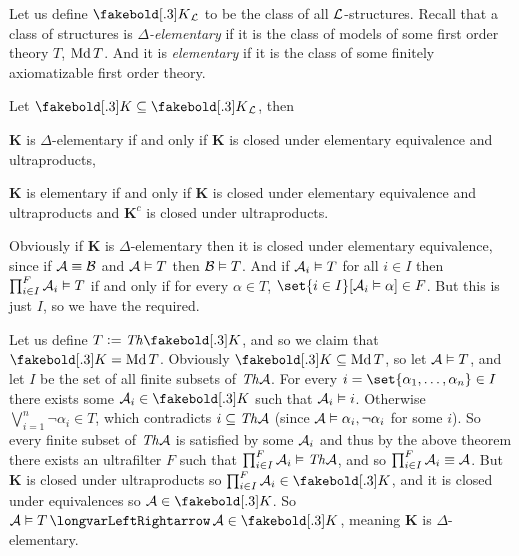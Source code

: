 Let us define $\boldsymbol K_{\cal L}$ to be the class of all ${\cal L}$-structures.
Recall that a class of structures is {\it $\Delta$-elementary} if it is the class of models of some first order theory $T$, $\mathop{\rm Md} T$.
And it is {\it elementary} if it is the class of some finitely axiomatizable first order theory.

\def\K{\boldsymbol K}
\bthrm

    Let $\K\subseteq\K_{\cal L}$, then
    \benum
        \item $\K$ is $\Delta$-elementary if and only if $\K$ is closed under elementary equivalence and ultraproducts,
        \item $\K$ is elementary if and only if $\K$ is closed under elementary equivalence and ultraproducts and $\K^c$ is closed under ultraproducts.
    \eenum

\ethrm

\benum
    \item Obviously if $\K$ is $\Delta$-elementary then it is closed under elementary equivalence, since if ${\cal A}\equiv{\cal B}$ and ${\cal A}\vDash T$ then ${\cal B}\vDash T$.
    And if ${\cal A}_i\vDash T$ for all $i\in I$ then $\prod_{i\in I}^F{\cal A}_i\vDash T$ if and only if for every $\alpha\in T$, $\set{i\in I}[{\cal A}_i\vDash\alpha]\in F$.
    But this is just $I$, so we have the required.

    Let us define $T\coloneqq\Th\K$, and so we claim that $\K=\Md T$.
    Obviously $\K\subseteq\Md T$, so let ${\cal A}\vDash T$, and let $I$ be the set of all finite subsets of ${\it Th}{\cal A}$.
    For every $i=\set{\alpha_1,\dots,\alpha_n}\in I$ there exists some ${\cal A}_i\in\K$ such that ${\cal A}_i\vDash i$.
    Otherwise $\bigvee_{i=1}^n\neg\alpha_i\in T$, which contradicts $i\subseteq{\it Th}{\cal A}$ (since ${\cal A}\vDash\alpha_i,\neg\alpha_i$ for some $i$).
    So every finite subset of ${\it Th}{\cal A}$ is satisfied by some ${\cal A}_i$ and thus by the above theorem there exists an ultrafilter $F$ such that $\prod_{i\in I}^F{\cal A}_i\vDash{\it Th}{\cal A}$, and so
    $\prod_{i\in I}^F{\cal A}_i\equiv{\cal A}$.
    But $\K$ is closed under ultraproducts so $\prod_{i\in I}^F{\cal A}_i\in\K$, and it is closed under equivalences so ${\cal A}\in\K$.
    So ${\cal A}\vDash T\iff{\cal A}\in\K$, meaning $\K$ is $\Delta$-elementary.

